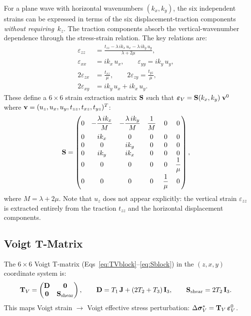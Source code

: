 For a plane wave with horizontal wavenumbers $(k_x,k_y)$, the six
independent strains can be expressed in terms of the six
displacement-traction components \emph{without requiring~$k_z$}.  The
traction components absorb the vertical-wavenumber dependence through the
stress-strain relation.  The key relations are:
\begin{align}
  \varepsilon_{zz}
    &= \frac{t_{zz} - \lambda\,ik_x\,u_x - \lambda\,ik_y\,u_y}
            {\lambda + 2\mu},
  \\
  \varepsilon_{xx} &= ik_x\,u_x, \qquad
  \varepsilon_{yy} = ik_y\,u_y,
  \\
  2\varepsilon_{zx} &= \frac{t_{xz}}{\mu}, \qquad
  2\varepsilon_{zy} = \frac{t_{yz}}{\mu},
  \\
  2\varepsilon_{xy} &= ik_y\,u_x + ik_x\,u_y.
\end{align}
These define a $6\times 6$ strain extraction matrix $\mathbf{S}$ such that
$\boldsymbol{\varepsilon}_V = \mathbf{S}(k_x,k_y)\;\mathbf{v}^0$
where $\mathbf{v} = (u_z, u_x, u_y, t_{zz}, t_{xz}, t_{yz})^T$:
\begin{equation}
\mathbf{S}
= \begin{pmatrix}
  0 & -\dfrac{\lambda\,ik_x}{M} & -\dfrac{\lambda\,ik_y}{M}
    & \dfrac{1}{M} & 0 & 0 \\[8pt]
  0 & ik_x & 0 & 0 & 0 & 0 \\
  0 & 0 & ik_y & 0 & 0 & 0 \\
  0 & ik_y & ik_x & 0 & 0 & 0 \\
  0 & 0 & 0 & 0 & 0 & \dfrac{1}{\mu} \\[8pt]
  0 & 0 & 0 & 0 & \dfrac{1}{\mu} & 0
\end{pmatrix},
\end{equation}
where $M = \lambda + 2\mu$.  Note that $u_z$ does not appear explicitly:
the vertical strain $\varepsilon_{zz}$ is extracted entirely from the
traction $t_{zz}$ and the horizontal displacement components.

\subsection{Voigt T-Matrix}

The $6\times 6$ Voigt T-matrix (Eqs~\ref{eq:TVblock}--\ref{eq:Sblock}) in the $(z,x,y)$ coordinate
system is:
\begin{equation}
  \mathbf{T}_V
  = \begin{pmatrix} \mathbf{D} & \mathbf{0} \\
                     \mathbf{0} & \mathbf{S}_{\mathrm{shear}} \end{pmatrix},
  \qquad
  \mathbf{D} = T_1\,\mathbf{J} + (2T_2 + T_3)\,\mathbf{I}_3,
  \qquad
  \mathbf{S}_{\mathrm{shear}} = 2T_2\,\mathbf{I}_3.
\end{equation}
This maps Voigt strain $\to$ Voigt effective stress perturbation:
$\Delta\boldsymbol{\sigma}^*_V
= \mathbf{T}_V\,\boldsymbol{\varepsilon}^0_V$.

